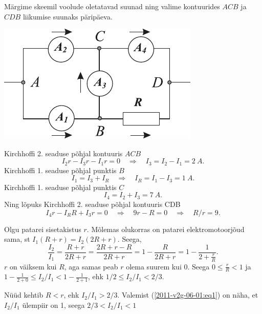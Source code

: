 \documentclass[10pt]{article}
\begin{document}
{%

\solu
Märgime skeemil voolude oletatavad suunad ning valime kontuurides $ACB$ ja $CDB$
liikumise suunaks päripäeva.

\begin{center}
	\includegraphics[width=0.6\linewidth]{2008-lahg-04-lah}
\end{center}

Kirchhoffi 2. seaduse põhjal kontuuris $ACB$
\[
I_2r - I_3r - I_1r = 0 \quad\Rightarrow\quad I_3 = I_2 - I_1 = \SI{2}{A}.
\]
Kirchhoffi 1. seaduse põhjal punktis $B$
\[
I_1 = I_3 + I_R \quad\Rightarrow\quad I_R = I_1 - I_3 = \SI{1}{A}.
\]
Kirchhoffi 1. seaduse põhjal punktis $C$
\[
I_4 = I_2 + I_3 = \SI{7}{A}.
\]
Ning lõpuks Kirchhoffi 2. seaduse põhjal kontuuris CDB
\[
I_4r - I_RR + I_3r = 0 \quad\Rightarrow\quad 9r - R = 0 \quad\Rightarrow\quad R/r = \num{9}.
\]
\probend
\bigskip


\solu
Olgu patarei sisetakistus $r$. Mõlemas olukorras on patarei elektromotoorjõud sama, st $I_1(R + r) = I_2(2R + r)$. Seega,
\begin{equation}\label{2011-v2g-06-01:eq1}
\frac{I_2}{I_1} = \frac{R + r}{2R + r} = \frac{2R + r - R}{2R + r} = 1 - \frac{R}{2R + r} = 1 - \frac{1}{2 + \frac{r}{R}}.
\end{equation}
\osa $r$ on väiksem kui $R$, aga samas peab $r$ olema suurem kui \num{0}. Seega $0 \leq \frac{r}{R} < 1$ ja $1 - \frac{1}{2 + 0} \leq I_2/I_1 < 1 - \frac{1}{2 + 1}$, ehk $1 / 2 \leq I_{2} / I_{1}<2 / 3$.

\osa Nüüd kehtib $R < r$, ehk $I_2/I_1 > 2/3$. Valemist (\ref{2011-v2g-06-01:eq1}) on näha, et $I_2/I_1$ ülempiir on \num{1}, seega $2/3 < I_2/I_1 < 1$
\probend
\bigskip


}
\end{document}
